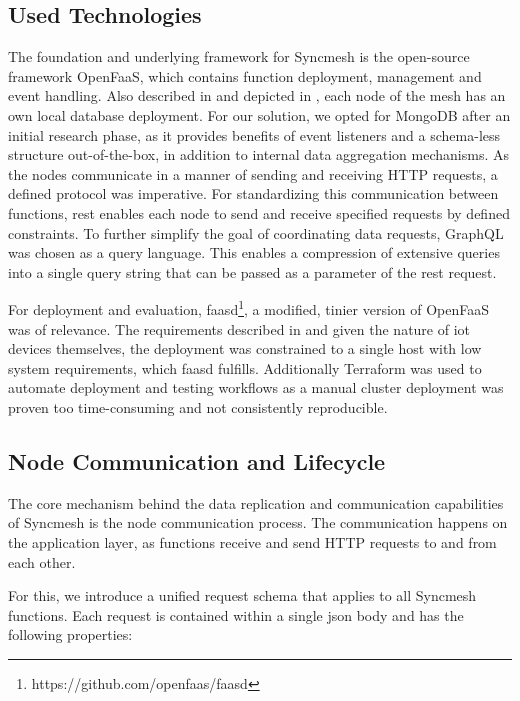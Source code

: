 \documentclass[conference]{IEEEtran}
\begin{document}
\subsection{Used Technologies}\label{Sec: Techstack}
The foundation and underlying framework for Syncmesh is the open-source framework OpenFaaS, which contains function deployment, management and event handling. Also described in  and depicted in , each node of the mesh has an own local database deployment. For our solution, we opted for MongoDB after an initial research phase, as it provides benefits of event listeners and a schema-less structure out-of-the-box, in addition to internal data aggregation mechanisms. As the nodes communicate in a manner of sending and receiving HTTP requests, a defined protocol was imperative. For standardizing this communication between functions, \ac{rest} enables each node to send and receive specified requests by defined constraints. To further simplify the goal of coordinating data requests, GraphQL was chosen as a query language. This enables a compression of extensive queries into a single query string that can be passed as a parameter of the \ac{rest} request.

For deployment and evaluation, faasd\footnote{https://github.com/openfaas/faasd}, a modified, tinier version of OpenFaaS was of relevance. The requirements described in  and given the nature of \ac{iot} devices themselves, the deployment was constrained to a single host with low system requirements, which faasd fulfills. Additionally Terraform was used to automate deployment and testing workflows as a manual cluster deployment was proven too time-consuming and not consistently reproducible.

\subsection{Node Communication and Lifecycle}\label{sec:node-lifecycle}
The core mechanism behind the data replication and communication capabilities of Syncmesh is the node communication process. The communication happens on the application layer, as functions receive and send HTTP requests to and from each other.

For this, we introduce a unified request schema that applies to all Syncmesh functions. Each request is contained within a single \ac{json} body and has the following properties:
\end{document}
